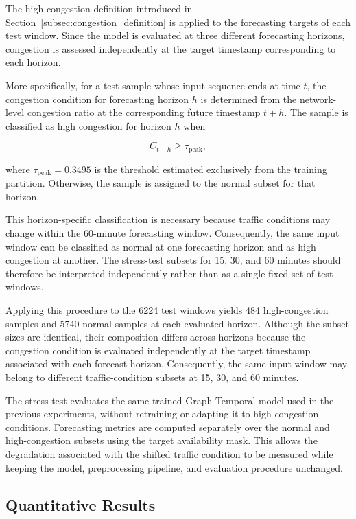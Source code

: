 The high-congestion definition introduced in
Section~\ref{subsec:congestion_definition} is applied to the forecasting
targets of each test window. Since the model is evaluated at three different
forecasting horizons, congestion is assessed independently at the target
timestamp corresponding to each horizon.

More specifically, for a test sample whose input sequence ends at time $t$,
the congestion condition for forecasting horizon $h$ is determined from the
network-level congestion ratio at the corresponding future timestamp
$t+h$. The sample is classified as high congestion for horizon $h$ when

\begin{equation}
    C_{t+h} \geq \tau_{\mathrm{peak}},
    \label{eq:high_congestion_sample}
\end{equation}

where $\tau_{\mathrm{peak}}=0.3495$ is the threshold estimated exclusively
from the training partition. Otherwise, the sample is assigned to the normal
subset for that horizon.

This horizon-specific classification is necessary because traffic conditions
may change within the 60-minute forecasting window. Consequently, the same
input window can be classified as normal at one forecasting horizon and as
high congestion at another. The stress-test subsets for 15, 30, and
60 minutes should therefore be interpreted independently rather than as a
single fixed set of test windows.

Applying this procedure to the 6224 test windows yields 484 high-congestion
samples and 5740 normal samples at each evaluated horizon. Although the
subset sizes are identical, their composition differs across horizons because
the congestion condition is evaluated independently at the target timestamp
associated with each forecast horizon. Consequently, the same input window
may belong to different traffic-condition subsets at 15, 30, and 60 minutes.

The stress test evaluates the same trained Graph-Temporal model used in the
previous experiments, without retraining or adapting it to high-congestion
conditions. Forecasting metrics are computed separately over the normal and
high-congestion subsets using the target availability mask. This allows the
degradation associated with the shifted traffic condition to be measured
while keeping the model, preprocessing pipeline, and evaluation procedure
unchanged.

\subsection{Quantitative Results}
\label{subsec:shift_quantitative}

